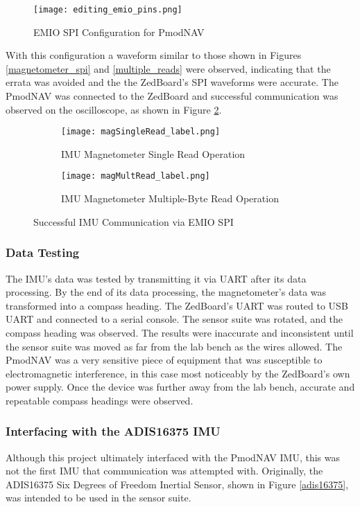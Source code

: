 \begin{figure}[H]
	\centerline{\texttt{[image: editing\_emio\_pins.png]}}
	\caption{EMIO SPI Configuration for PmodNAV}
	\label{emio_config}
\end{figure}

With this configuration a waveform similar to those shown in Figures \ref{magnetometer_spi} and \ref{multiple_reads} were observed, indicating that the errata was avoided and the the ZedBoard's SPI waveforms were accurate. The PmodNAV was connected to the ZedBoard and successful communication was observed on the oscilloscope, as shown in Figure \ref{OTPHJ}.

\begin{figure}[H] 
	\begin{subfigure}{1\textwidth}
	\centering
		\texttt{[image: magSingleRead\_label.png]}
		\caption{IMU Magnetometer Single Read Operation}
	\end{subfigure}
	\begin{subfigure}{1\textwidth}
	\centering
		\texttt{[image: magMultRead\_label.png]}
		\caption{IMU Magnetometer Multiple-Byte Read Operation}
	\end{subfigure}
	\caption{Successful IMU Communication via EMIO SPI}
	\label{OTPHJ}
\end{figure}

\subsubsection{Data Testing}
The IMU's data was tested by transmitting it via UART after its data processing. By the end of its data processing, the magnetometer's data was transformed into a compass heading. The ZedBoard's UART was routed to USB UART and connected to a serial console. The sensor suite was rotated, and the compass heading was observed. The results were inaccurate and inconsistent until the sensor suite was moved as far from the lab bench as the wires allowed. The PmodNAV was a very sensitive piece of equipment that was susceptible to electromagnetic interference, in this case most noticeably by the ZedBoard's own power supply. Once the device was further away from the lab bench, accurate and repeatable compass headings were observed.

\subsubsection{Interfacing with the ADIS16375 IMU}
Although this project ultimately interfaced with the PmodNAV IMU, this was not the first IMU that communication was attempted with. Originally, the ADIS16375 Six Degrees of Freedom Inertial Sensor, shown in Figure \ref{adis16375}, was intended to be used in the sensor suite.

